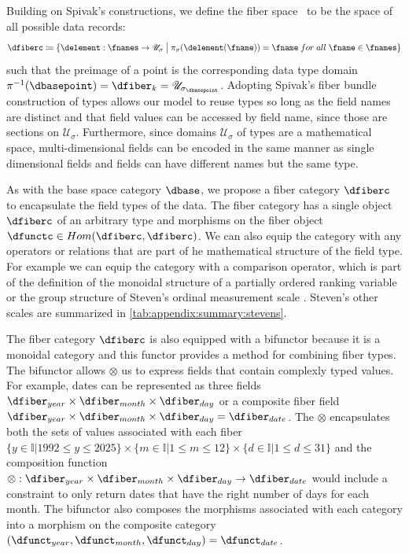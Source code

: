 \documentclass[journal]{IEEEtran}
\theoremstyle{definition}
\theoremstyle{remark}
\begin{document}
Building on Spivak's constructions, we define the \textcolor{fiber}{fiber space} \dfiberc\ to be the space of all possible data records:
\begin{equation}
  \dfiberc \coloneqq \{\delement: \fnames \rightarrow \mathscr{U}_{\sigma} \bigm{\vert} \pi_{\sigma}(\delement(\fname)) = \fname\;for\;all\; \fname \in \fnames \}
\end{equation}
such that the preimage of a point is the corresponding data type domain $\pi^{-1}(\dbasepoint) = \dfiber_{k} = \mathscr{U}_{{\sigma}_{\dbasepoint}}$. Adopting Spivak's fiber bundle construction of types allows our model to reuse types so long as the field names are distinct and that field values can be accessed by field name,  since those are sections on $\mathcal{U}_{\sigma}$. Furthermore, since domains $\mathscr{U}_{{\sigma}}$ of types are a mathematical space, multi-dimensional fields can be encoded in the same manner as single dimensional fields and fields can have different names but the same type.

As with the base space category $\mathcal{\dbase}$, we propose a fiber category $\mathcal{\dfiberc}$ to encapsulate the field types of the data. The fiber category has a single object $\dfiberc$ of an arbitrary type and morphisms on the fiber object $\dfunctc \in Hom(\dfiberc, \dfiberc)$. We can also equip the category with any operators or relations that are part of he mathematical structure of the field type. For example we can equip the category with a comparison operator, which is part of the definition of the monoidal structure of a partially ordered ranking variable \cite{bruggemannRankingPrioritizationMultiindicator2011} or the group structure of Steven's ordinal measurement scale \cite{stevensTheoryScalesMeasurement1946, leaFormalizationMeasurementScale1971, thomasMathematizationNotMeasurement2014}. Steven's other scales are summarized in \autoref{tab:appendix:summary:stevens}.

The fiber category $\mathcal{\dfiberc}$ is also equipped with a bifunctor because it is a monoidal category and this functor provides a method for combining fiber types. The bifunctor allows $\otimes$ us to express fields that contain complexly typed values. For example, dates can be represented as three fields $\dfiber_{year} \times \dfiber_{month} \times \dfiber_{day}$ or a composite fiber field $\dfiber_{year} \times \dfiber_{month} \times \dfiber_{day} = \dfiber_{date}$. The $\otimes$ encapsulates both the sets of values associated with each fiber $\{y \in \mathbb{I}\vert 1992 \leq y \leq 2025\} \times \{m \in \mathbb{I}\vert 1 \leq m \leq 12 \} \times \{d \in \mathbb{I}\vert 1 \leq d \leq 31 \}$ and the composition function $ \otimes: \dfiber_{year} \times \dfiber_{month} \times \dfiber_{day} \rightarrow \dfiber_{date}$
would include a constraint to only return dates that have the right number of days for each month. The bifunctor also composes the morphisms associated with each category into a morphism on the composite category $(\dfunct_{year}, \dfunct_{month}, \dfunct_{day}) = \dfunct_{date}$.
\end{document}

